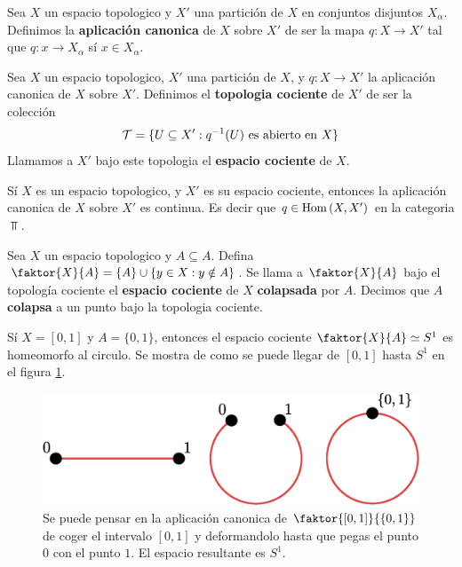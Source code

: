 \begin{definition}
    Sea $X$ un espacio topologico y $X'$ una partici\'on de $X$ en conjuntos
    disjuntos  $X_\alpha$. Definimos la  \textbf{aplicaci\'on canonica} de $X$
    sobre  $X'$ de ser la mapa $q:X \xrightarrow{} X'$ tal que $q:x \xrightarrow{}
    X_\alpha$ s\'i $x \in X_\alpha$.
\end{definition}

\begin{definition}
    Sea $X$ un espacio topologico,  $X'$ una partici\'on de  $X$, y  $q:X
    \xrightarrow{} X'$ la aplicaci\'on canonica de $X$ sobre $X'$. Definimos el
    \textbf{topologia cociente} de $X'$ de ser la colecci\'on
    \begin{equation*}
        \mathcal{T}=\{U \subseteq X' : q^{-1}(U) \text{ es abierto en } X\}
    \end{equation*}
    Llamamos a $X'$ bajo este topologia el  \textbf{espacio cociente} de $X$.
\end{definition}

\begin{lemma}\label{lemma_8.14}
    S\'i $X$ es un espacio topologico, y  $X'$ es su espacio cociente, entonces
    la aplicaci\'on canonica de  $X$ sobre  $X'$ es continua. Es decir que $q
    \in \operatorname{Hom}{(X,X')}$ en la categoria $\Top$.
\end{lemma}

\begin{definition}
    Sea $X$ un espacio topologico y  $A \subseteq A$. Defina
    $\faktor{X}{A}=\{A\} \cup \{y \in X : y \notin A\}$. Se llama a
    $\faktor{X}{A}$ bajo el topolog\'ia cociente el \textbf{espacio cociente} de
    $X$  \textbf{colapsada} por $A$. Decimos que $A$ \textbf{colapsa} a un punto
    bajo la topologia cociente.
\end{definition}

\begin{example}\label{}
    S\'i $X=[0,1]$ y $A=\{0,1\}$, entonces el espacio cociente $\faktor{X}{A}
    \simeq S^1$ es homeomorfo al circulo. Se mostra de como se puede llegar de
    $[0,1]$ hasta $S^1$ en el figura \ref{fig_19}.

    \begin{figure}[h]
        \centering
        \includegraphics[scale=0.5]{Figures/interval_to_circle.eps}
        \caption{Se puede pensar en la aplicaci\'on canonica de
            $\faktor{[0,1]}{\{0,1\}}$ de coger el intervalo $[0,1]$ y
        deformandolo hasta que pegas el punto $0$ con el punto $1$. El espacio
        resultante es $S^1$.}
        \label{fig_19}
    \end{figure}
\end{example}
